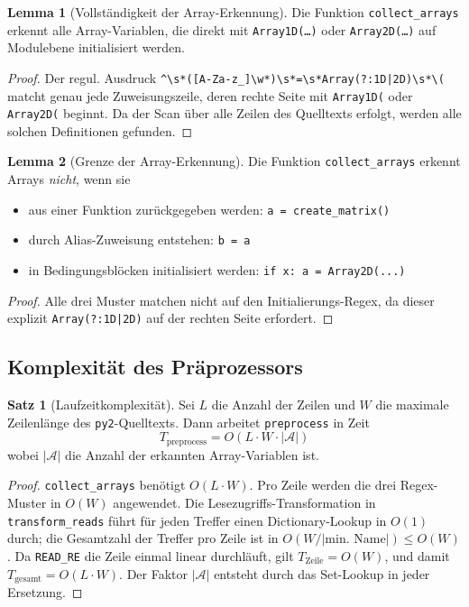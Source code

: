 \documentclass[a4paper,12pt]{article}
\theoremstyle{definition}
\newtheorem{satz}{Satz}
\newtheorem{lemma}{Lemma}
\begin{document}
\begin{lemma}[Vollst\"andigkeit der Array-Erkennung]
	Die Funktion \texttt{collect\_arrays} erkennt alle Array-Variablen, die direkt
	mit \texttt{Array1D(\ldots)} oder \texttt{Array2D(\ldots)} auf Modulebene
	initialisiert werden.
\end{lemma}

\begin{proof}
	Der regul. Ausdruck \texttt{\^{}\textbackslash{}s*([A-Za-z\_]\textbackslash{}w*)\textbackslash{}s*=\textbackslash{}s*Array(?:1D|2D)\textbackslash{}s*\textbackslash{}(}
	matcht genau jede Zuweisungszeile, deren rechte Seite mit \texttt{Array1D(} oder
	\texttt{Array2D(} beginnt. Da der Scan \"uber alle Zeilen des Quelltexts erfolgt,
	werden alle solchen Definitionen gefunden.
\end{proof}

\begin{lemma}[Grenze der Array-Erkennung]
	Die Funktion \texttt{collect\_arrays} erkennt Arrays \emph{nicht}, wenn sie
	\begin{itemize}
		\item aus einer Funktion zur\"uckgegeben werden: \texttt{a = create\_matrix()}
		\item durch Alias-Zuweisung entstehen: \texttt{b = a}
		\item in Bedingungsbl\"ocken initialisiert werden: \texttt{if x: a = Array2D(...)}
	\end{itemize}
\end{lemma}

\begin{proof}
	Alle drei Muster matchen nicht auf den Initialierungs-Regex, da dieser explizit
	\texttt{Array(?:1D|2D)} auf der rechten Seite erfordert.
\end{proof}

\subsection{Komplexit\"at des Pr\"aprozessors}

\begin{satz}[Laufzeitkomplexit\"at]
	Sei $L$ die Anzahl der Zeilen und $W$ die maximale Zeilenl\"ange des
	\texttt{py2}-Quelltexts. Dann arbeitet \texttt{preprocess} in Zeit
	\[
		T_{\text{preprocess}} = O(L \cdot W \cdot |\mathcal{A}|)
	\]
	wobei $|\mathcal{A}|$ die Anzahl der erkannten Array-Variablen ist.
\end{satz}

\begin{proof}
	\texttt{collect\_arrays} ben\"otigt $O(L \cdot W)$. Pro Zeile werden die drei
	Regex-Muster in $O(W)$ angewendet. Die Lesezugriffs-Transformation in
	\texttt{transform\_reads} f\"uhrt f\"ur jeden Treffer einen Dictionary-Lookup
	in $O(1)$ durch; die Gesamtzahl der Treffer pro Zeile ist in $O(W / |\text{min.~Name}|)
	\leq O(W)$. Da \texttt{READ\_RE} die Zeile einmal linear durchl\"auft, gilt
	$T_{\text{Zeile}} = O(W)$, und damit $T_{\text{gesamt}} = O(L \cdot W)$.
	Der Faktor $|\mathcal{A}|$ entsteht durch das Set-Lookup in jeder Ersetzung.
\end{proof}
\end{document}
